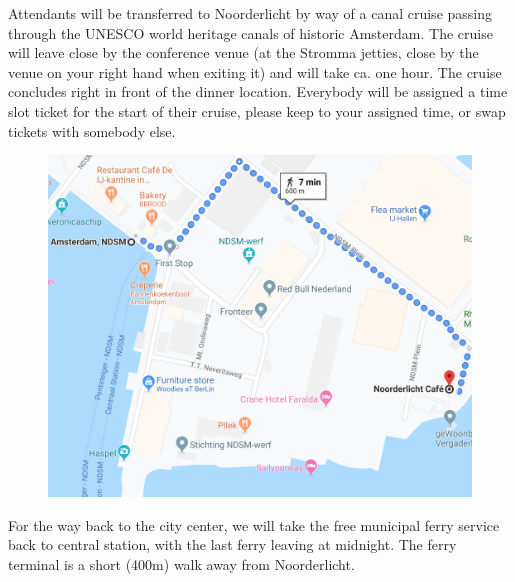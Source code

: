 Attendants will be transferred to Noorderlicht by way of a canal cruise passing through the UNESCO world heritage canals of historic Amsterdam. The cruise will leave close by the conference venue (at the Stromma jetties, close by the venue on your right hand when exiting it) and will take ca. one hour. The cruise concludes right in front of the dinner location. Everybody will be assigned a time slot ticket for the start of their cruise, please keep to your assigned time, or swap tickets with somebody else. 

\begin{figure}[h]
\centering
\includegraphics[width=.6\textwidth]{images/noorderlicht-ndsmferry.png}
\end{figure}


For the way back to the city center, we will take the free municipal ferry service back to central station, with the last ferry leaving at midnight. The ferry terminal is a short (400m) walk away from Noorderlicht.
